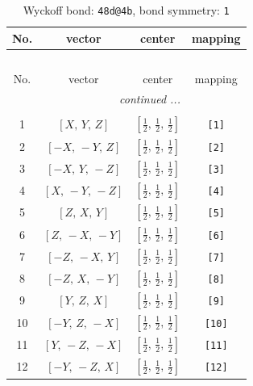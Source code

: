 \documentclass[fleqn,8pt]{jsarticle}
\begin{document}
\begin{longtable}{cccc}
\caption{Wyckoff bond: {\tt 48d@4b}, bond symmetry: {\tt 1}}
 \\
 \hline \hline
No. & vector & center & mapping \\ \hline \endfirsthead

\multicolumn{3}{l}{\tablename\ \thetable{}} \\
 \hline \hline
No. & vector & center & mapping \\ \hline \endhead

 \hline \hline
\multicolumn{3}{r}{\footnotesize\it continued ...} \\ \endfoot

 \hline \hline
\multicolumn{3}{r}{} \\ \endlastfoot

1 & $\left[ X,\, Y,\, Z \right]$ & $\left[ \frac{1}{2},\, \frac{1}{2},\, \frac{1}{2} \right]$ & {\tt [1]} \\ \hline
2 & $\left[ - X,\, - Y,\, Z \right]$ & $\left[ \frac{1}{2},\, \frac{1}{2},\, \frac{1}{2} \right]$ & {\tt [2]} \\ \hline
3 & $\left[ - X,\, Y,\, - Z \right]$ & $\left[ \frac{1}{2},\, \frac{1}{2},\, \frac{1}{2} \right]$ & {\tt [3]} \\ \hline
4 & $\left[ X,\, - Y,\, - Z \right]$ & $\left[ \frac{1}{2},\, \frac{1}{2},\, \frac{1}{2} \right]$ & {\tt [4]} \\ \hline
5 & $\left[ Z,\, X,\, Y \right]$ & $\left[ \frac{1}{2},\, \frac{1}{2},\, \frac{1}{2} \right]$ & {\tt [5]} \\ \hline
6 & $\left[ Z,\, - X,\, - Y \right]$ & $\left[ \frac{1}{2},\, \frac{1}{2},\, \frac{1}{2} \right]$ & {\tt [6]} \\ \hline
7 & $\left[ - Z,\, - X,\, Y \right]$ & $\left[ \frac{1}{2},\, \frac{1}{2},\, \frac{1}{2} \right]$ & {\tt [7]} \\ \hline
8 & $\left[ - Z,\, X,\, - Y \right]$ & $\left[ \frac{1}{2},\, \frac{1}{2},\, \frac{1}{2} \right]$ & {\tt [8]} \\ \hline
9 & $\left[ Y,\, Z,\, X \right]$ & $\left[ \frac{1}{2},\, \frac{1}{2},\, \frac{1}{2} \right]$ & {\tt [9]} \\ \hline
10 & $\left[ - Y,\, Z,\, - X \right]$ & $\left[ \frac{1}{2},\, \frac{1}{2},\, \frac{1}{2} \right]$ & {\tt [10]} \\ \hline
11 & $\left[ Y,\, - Z,\, - X \right]$ & $\left[ \frac{1}{2},\, \frac{1}{2},\, \frac{1}{2} \right]$ & {\tt [11]} \\ \hline
12 & $\left[ - Y,\, - Z,\, X \right]$ & $\left[ \frac{1}{2},\, \frac{1}{2},\, \frac{1}{2} \right]$ & {\tt [12]} \\
\end{longtable}
\end{document}
